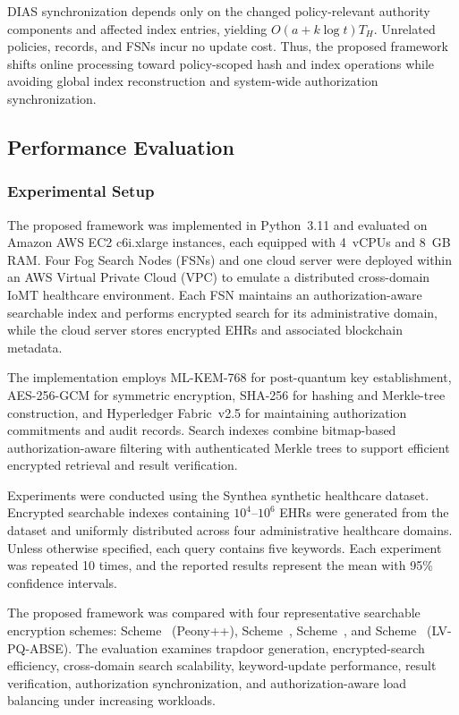\documentclass{ieeetj}
\theoremstyle{ieee-style}
\begin{document}
DIAS synchronization depends only on the changed policy-relevant
authority components and affected index entries, yielding
$O(a+k\log t)T_H$. Unrelated policies, records, and FSNs incur no update
cost. Thus, the proposed framework shifts online processing toward
policy-scoped hash and index operations while avoiding global index
reconstruction and system-wide authorization synchronization.
\subsection{Performance Evaluation}

\subsubsection{Experimental Setup}

The proposed framework was implemented in Python~3.11 and evaluated
on Amazon AWS EC2 c6i.xlarge instances, each equipped with 4~vCPUs
and 8~GB RAM. Four Fog Search Nodes (FSNs) and one cloud server were
deployed within an AWS Virtual Private Cloud (VPC) to emulate a
distributed cross-domain IoMT healthcare environment. Each FSN
maintains an authorization-aware searchable index and performs
encrypted search for its administrative domain, while the cloud
server stores encrypted EHRs and associated blockchain metadata.

The implementation employs ML-KEM-768 for post-quantum key
establishment, AES-256-GCM for symmetric encryption, SHA-256 for
hashing and Merkle-tree construction, and Hyperledger Fabric~v2.5
for maintaining authorization commitments and audit records.
Search indexes combine bitmap-based authorization-aware filtering
with authenticated Merkle trees to support efficient encrypted
retrieval and result verification.

Experiments were conducted using the Synthea synthetic healthcare
dataset. Encrypted searchable indexes containing $10^4$--$10^6$ EHRs were generated from the dataset and uniformly
distributed across four administrative healthcare domains. Unless
otherwise specified, each query contains five keywords. Each
experiment was repeated 10 times, and the reported results represent
the mean with 95\% confidence intervals.

The proposed framework was compared with four representative
searchable encryption schemes: Scheme~\cite{ref30} (Peony++),
Scheme~\cite{ref35}, Scheme~\cite{ref41}, and
Scheme~\cite{ref54} (LV-PQ-ABSE). The evaluation examines trapdoor
generation, encrypted-search efficiency, cross-domain search
scalability, keyword-update performance, result verification,
authorization synchronization, and authorization-aware load
balancing under increasing workloads.
\end{document}
